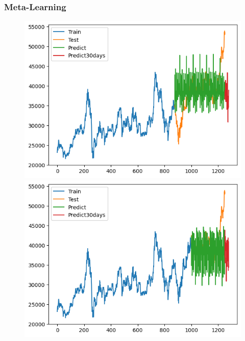 \subsubsection{Meta-Learning}
\begin{figure}[H]
    \centering
    \begin{minipage}{0.15\textwidth}
    \centering
    \includegraphics[width=1\textwidth]{resources/chapter-5/result/BIDV_ML_7_3.png}
    \end{minipage}
    \hfill
    \begin{minipage}{0.15\textwidth}
    \centering
    \includegraphics[width=1\textwidth]{resources/chapter-5/result/BIDV_ML_8_2.png}
    \end{minipage}
    \hfill
        \begin{minipage}{0.15\textwidth}

\end{minipage}
\end{figure}
